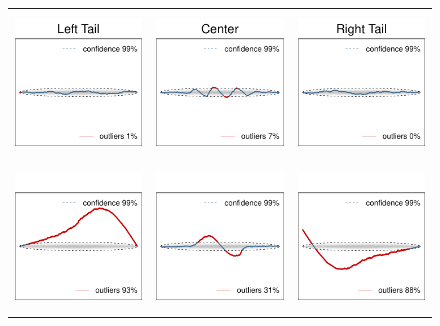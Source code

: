 \begin{figure}[tbp]
\centering
\begin{tabular}{p{} p{}p{}}
  \includegraphics[width=1.55in, height=1.5in]{Figure6a.pdf} &
  \includegraphics[width=1.55in, height=1.5in]{Figure6b.pdf} &
  \includegraphics[width=1.55in, height=1.5in]{Figure6c.pdf} \\
  \includegraphics[width=1.55in, height=1.5in]{Figure6d.pdf} &
  \includegraphics[width=1.55in, height=1.5in]{Figure6e.pdf} &
  \includegraphics[width=1.55in, height=1.5in]{Figure6f.pdf} \\

\end{tabular}
\end{figure}
